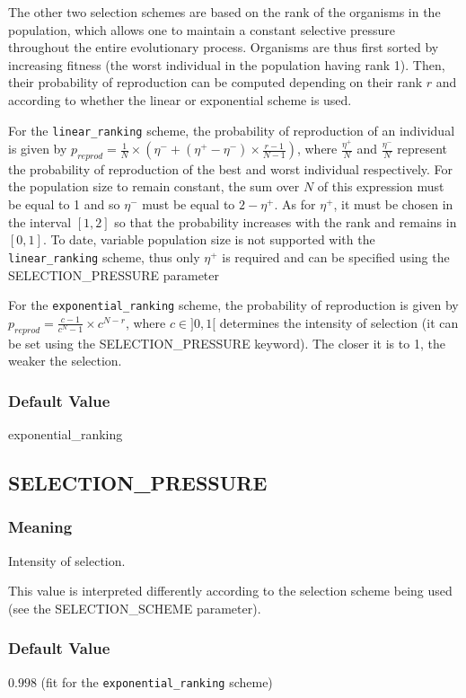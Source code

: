 The other two selection schemes are based on the rank of the organisms in the population, which allows one to maintain a constant selective pressure throughout the entire evolutionary process. Organisms are thus first sorted by increasing fitness (the worst individual in the population having rank 1). Then, their probability of reproduction can be computed depending on their rank $r$ and according to whether the linear or exponential scheme is used.

For the \verb?linear_ranking? scheme, the probability of reproduction of an individual is given by $p_{reprod} = \frac{1}{N}\times{}(\eta{}^- + (\eta{}^+ - \eta{}^-)\times{}\frac{r - 1}{N - 1})$, where $\frac{\eta{}^+}{N}$ and $\frac{\eta{}^-}{N}$ represent the probability of reproduction of the best and worst individual respectively. For the population size to remain constant, the sum over $N$ of this expression must be equal to 1 and so $\eta{}^-$ must be equal to $2 - \eta{}^+$. As for $\eta{}^+$, it must be chosen in the interval $[1,2]$ so that the probability increases with the rank and remains in $[0,1]$. To date, variable population size is not supported with the \verb?linear_ranking? scheme, thus only $\eta{}^+$ is required and can be specified using the SELECTION\_PRESSURE parameter

For the \verb?exponential_ranking? scheme, the probability of reproduction is given by $p_{reprod} = \frac{c - 1}{c^N - 1}\times{}c^{N-r}$, where $c \in ]0,1[$ determines the intensity of selection (it can be set using the SELECTION\_PRESSURE keyword). The closer it is to 1, the weaker the selection.
\subsubsection{Default Value}
exponential\_ranking

\subsection{SELECTION\_PRESSURE}
\subsubsection{Meaning}
Intensity of selection.

This value is interpreted differently according to the selection scheme being used (see the SELECTION\_SCHEME parameter).
\subsubsection{Default Value}
$0.998$ (fit for the \verb?exponential_ranking? scheme)




